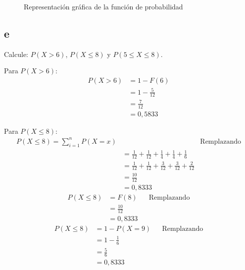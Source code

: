 \documentclass{templateNote}
\begin{document}
\begin{figure}[H]
\begin{center}
        \caption{Representación gráfica de la función de probabilidad}
    \end{center}
\end{figure}

\subsection{e}
Calcule: $P(X > 6)$, $P(X \leq 8)$ y $P(5 \leq X \leq 8)$.

Para $P(X > 6)$:
\begin{align*}
    P(X > 6) &= 1 - F(6) \\
    &= 1 - \frac{5}{12} \\
    &= \frac{7}{12} \\
    &= 0,5833
\end{align*}

Para $P(X \leq 8)$:
\begin{align*}
    P(X \leq 8) = \displaystyle \sum_{i=1}^{n}{P(X=x)} && \text{Remplazando} \\
    &= \frac{1}{12} + \frac{1}{12} + \frac{1}{4} + \frac{1}{4} + \frac{1}{6} \\
    &= \frac{1}{12} + \frac{1}{12} + \frac{3}{12} + \frac{3}{12} + \frac{2}{12} \\
    &= \frac{10}{12} \\
    &= 0,8333
\end{align*}
\begin{align*}
    P(X \leq 8) &= F(8) && \text{Remplazando} \\
    &= \frac{10}{12} \\
    &= 0,8333
\end{align*}
\begin{align*}
    P(X \leq 8) &= 1 - P(X = 9) && \text{Remplazando} \\
    &= 1 - \frac{1}{6} \\
    &= \frac{5}{6} \\
    &= 0,8333
\end{align*}
\end{document}
